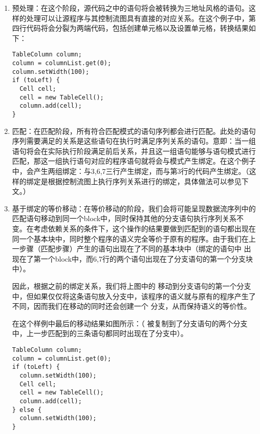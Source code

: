 \begin{enumerate}
\item 预处理：在这个阶段，源代码之中的语句将会被转换为三地址风格的语句。这样的处理可以让源程序与其控制流图具有直接的对应关系。在这个例子中，第四行代码将会分裂为两端代码，包括创建单元格以及设置单元格，转换结果如下：
\begin{center}
\begin{smpage}{0.5\columnwidth}
\begin{lstlisting}[style=java]
TableColumn column;
column = columnList.get(0);
column.setWidth(100);
if (toLeft) {
  Cell cell;
  cell = new TableCell();
  column.add(cell);
} 
\end{lstlisting}
\end{smpage}
\end{center}

\item 匹配：在匹配阶段，所有符合匹配模式的语句序列都会进行匹配。此处的语句序列需要满足的关系是这些语句在执行时满足序列关系的语句。意即：当一组语句将会在实际执行阶段满足前后关系，并且这一组语句能够与语句模式进行匹配，那这一组执行语句对应的程序语句就将会与模式产生绑定。在这个例子中，会产生两组绑定：与3,6,7三行产生绑定，而与第3行的代码产生绑定。（这样的绑定是根据控制流图上执行序列关系进行的绑定，具体做法可以参见下文。）
\item 基于绑定的等价移动：在等价移动的阶段，我们会将可能呈现数据流序列中的匹配语句移动到同一个block中，同时保持其他的分支语句执行序列关系不变。在考虑依赖关系的条件下，这个操作的结果要做到匹配到的语句都出现在同一个基本块中，同时整个程序的语义完全等价于原有的程序。由于我们在上一步骤（匹配步骤）产生的语句出现在了不同的基本块中（绑定的语句中  出现在了第一个block中，而6,7行的两个语句出现在了分支语句的第一个分支块中）。

因此，根据之前的绑定关系，我们将上图中的  移动到分支语句的第一个分支中，但如果仅仅将这条语句放入分支中，该程序的语义就与原有的程序产生了不同，因而我们在移动的同时还会创建一个  分支，从而保持语义的等价性。

在这个样例中最后的移动结果如图所示：（ 被复制到了分支语句的两个分支中，上一步匹配到的三条语句都同时出现在了分支中）。

\begin{center}
\begin{smpage}{0.5\columnwidth}
\begin{lstlisting}[style=java]
TableColumn column;
column = columnList.get(0);
if (toLeft) {
  column.setWidth(100);
  Cell cell;
  cell = new TableCell();
  column.add(cell);
} else {
  column.setWidth(100);
}
\end{lstlisting}
\end{smpage}
\end{center}


\end{enumerate}
